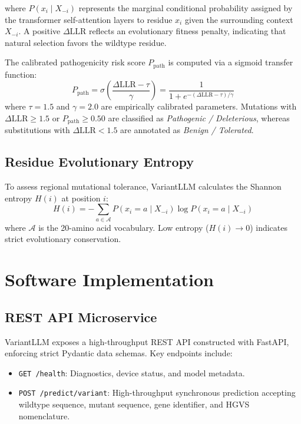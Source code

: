 \documentclass[10pt,twocolumn,letterpaper]{article}
\begin{document}
where $P(x_i \mid X_{-i})$ represents the marginal conditional probability assigned by the transformer self-attention layers to residue $x_i$ given the surrounding context $X_{-i}$. A positive $\Delta\text{LLR}$ reflects an evolutionary fitness penalty, indicating that natural selection favors the wildtype residue.

The calibrated pathogenicity risk score $P_{\text{path}}$ is computed via a sigmoid transfer function:
\begin{equation}
P_{\text{path}} = \sigma\left(\frac{\Delta\text{LLR} - \tau}{\gamma}\right) = \frac{1}{1 + e^{-(\Delta\text{LLR} - \tau)/\gamma}}
\end{equation}
where $\tau = 1.5$ and $\gamma = 2.0$ are empirically calibrated parameters. Mutations with $\Delta\text{LLR} \ge 1.5$ or $P_{\text{path}} \ge 0.50$ are classified as \textit{Pathogenic / Deleterious}, whereas substitutions with $\Delta\text{LLR} < 1.5$ are annotated as \textit{Benign / Tolerated}.

\subsection{Residue Evolutionary Entropy}
To assess regional mutational tolerance, VariantLLM calculates the Shannon entropy $H(i)$ at position $i$:
\begin{equation}
H(i) = -\sum_{a \in \mathcal{A}} P(x_i = a \mid X_{-i}) \log P(x_i = a \mid X_{-i})
\end{equation}
where $\mathcal{A}$ is the 20-amino acid vocabulary. Low entropy ($H(i) \to 0$) indicates strict evolutionary conservation.

\section{Software Implementation}

\subsection{REST API Microservice}
VariantLLM exposes a high-throughput REST API constructed with FastAPI, enforcing strict Pydantic data schemas. Key endpoints include:
\begin{itemize}
    \item \texttt{GET /health}: Diagnostics, device status, and model metadata.
    \item \texttt{POST /predict/variant}: High-throughput synchronous prediction accepting wildtype sequence, mutant sequence, gene identifier, and HGVS nomenclature.
\end{itemize}
\end{document}
